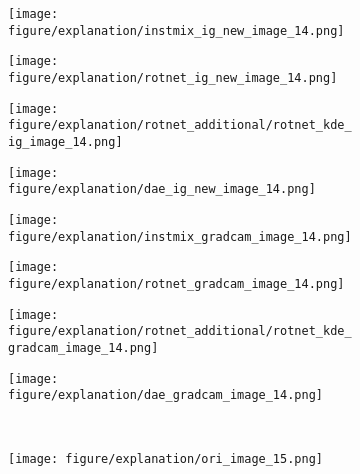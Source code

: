 \documentclass{article} \usepackage{iclr2021_conference,times}
\begin{document}
\begin{figure}[h!]
\begin{subfigure}{.11\textwidth}
  \centering
  \texttt{[image: figure/explanation/instmix\_ig\_new\_image\_14.png]}
\end{subfigure}
\hspace{-2mm}
\begin{subfigure}{.11\textwidth}
  \centering
  \texttt{[image: figure/explanation/rotnet\_ig\_new\_image\_14.png]}
\end{subfigure}
\hspace{-2mm}
\begin{subfigure}{.11\textwidth}
  \centering
  \texttt{[image: figure/explanation/rotnet\_additional/rotnet\_kde\_ig\_image\_14.png]}
\end{subfigure}
\hspace{-2mm}
\begin{subfigure}{.11\textwidth}
  \centering
  \texttt{[image: figure/explanation/dae\_ig\_new\_image\_14.png]}
\end{subfigure}
\hspace{-2mm}
\begin{subfigure}{.11\textwidth}
  \centering
  \texttt{[image: figure/explanation/instmix\_gradcam\_image\_14.png]}
\end{subfigure}
\hspace{-2mm}
\begin{subfigure}{.11\textwidth}
  \centering
  \texttt{[image: figure/explanation/rotnet\_gradcam\_image\_14.png]}
\end{subfigure}
\hspace{-2mm}
\begin{subfigure}{.11\textwidth}
  \centering
  \texttt{[image: figure/explanation/rotnet\_additional/rotnet\_kde\_gradcam\_image\_14.png]}
\end{subfigure}
\hspace{-2mm}
\begin{subfigure}{.11\textwidth}
  \centering
  \texttt{[image: figure/explanation/dae\_gradcam\_image\_14.png]}
\end{subfigure}\\
\begin{subfigure}{.11\textwidth}
  \centering
  \texttt{[image: figure/explanation/ori\_image\_15.png]}
\end{subfigure}
\hspace{-2mm}
\begin{subfigure}{.11\textwidth}

\end{subfigure}
\end{figure}
\end{document}
